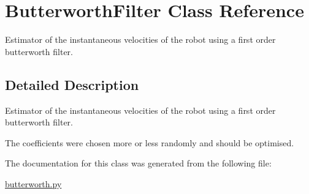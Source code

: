 \hypertarget{classButterworthFilter}{}\section{Butterworth\+Filter Class Reference}
\label{classButterworthFilter}


Estimator of the instantaneous velocities of the robot using a first order butterworth filter.  




\subsection{Detailed Description}
Estimator of the instantaneous velocities of the robot using a first order butterworth filter. 

The coefficients were chosen more or less randomly and should be optimised. 

The documentation for this class was generated from the following file\+:\begin{DoxyCompactItemize}
\item 
\hyperlink{butterworth_8py}{butterworth.\+py}\end{DoxyCompactItemize}
